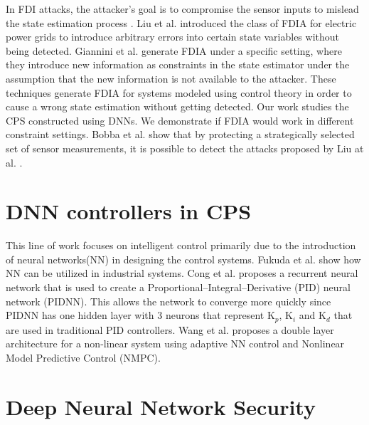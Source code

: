In FDI attacks, the attacker's goal is to compromise the sensor inputs to mislead the state estimation process \cite{e3f0020abba24d4389aff937fe8bcdd5}. Liu et al. \cite{10.1145/1952982.1952995} introduced the class of FDIA for electric power grids to introduce arbitrary errors into certain state variables without being detected. Giannini et al. \cite{unknown} generate FDIA under a specific setting, 
where they introduce new information as constraints in the state estimator under the assumption that the new information is not available to the attacker. These techniques generate FDIA for systems modeled using control theory in order to cause a wrong state estimation without getting detected. Our work studies the CPS constructed using \ac{DNN}s. We demonstrate if  \ac{FDIA} would work in different constraint settings. 
Bobba et al. \cite{Bobba2010DetectingFD} show that by protecting a strategically selected set of sensor measurements, it is possible to detect the attacks proposed by Liu at al. \cite{10.1145/1952982.1952995}.

\section{DNN controllers in CPS}
This line of work focuses on intelligent control primarily due to the introduction of neural networks(NN) in designing the control systems. %
Fukuda et al. \cite{170966} show how NN can be utilized in industrial systems. Cong et al. \cite{Cong} proposes a recurrent neural network that is used to create a Proportional–Integral–Derivative (PID) neural network (PIDNN). 
This allows the network to converge more quickly since PIDNN has one hidden layer with 3 neurons that represent K$_p$, K$_i$ and K$_d$ that are used in traditional PID controllers. Wang et al. \cite{Wang2016ACA} proposes a double layer architecture for a non-linear system using adaptive NN control and Nonlinear Model Predictive Control (NMPC).

\section{Deep Neural Network Security}

